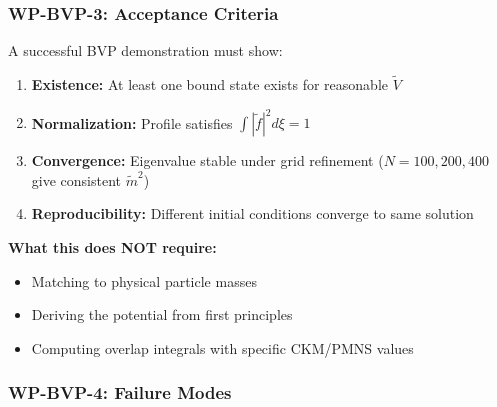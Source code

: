 \subsubsection{WP-BVP-3: Acceptance Criteria}
\label{sec:bvp_acceptance}

\begin{tcolorbox}[colback=green!5!white, colframe=green!50!black,
    title=\textbf{Acceptance Criteria for BVP Skeleton}]
A successful BVP demonstration must show:
\begin{enumerate}
    \item \textbf{Existence:} At least one bound state exists for reasonable $\tilde{V}$
    \item \textbf{Normalization:} Profile satisfies $\int |\tilde{f}|^2 d\xi = 1$
    \item \textbf{Convergence:} Eigenvalue stable under grid refinement
          ($N = 100, 200, 400$ give consistent $\tilde{m}^2$)
    \item \textbf{Reproducibility:} Different initial conditions converge to same solution
\end{enumerate}

\textbf{What this does NOT require:}
\begin{itemize}[nosep]
    \item Matching to physical particle masses
    \item Deriving the potential from first principles
    \item Computing overlap integrals with specific CKM/PMNS values
\end{itemize}
\end{tcolorbox}

\subsubsection{WP-BVP-4: Failure Modes}
\label{sec:bvp_failure}

